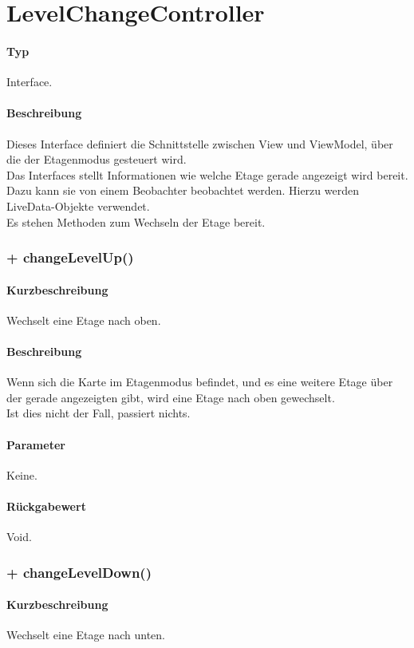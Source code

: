 \section{LevelChangeController}
\paragraph*{Typ}
Interface.
\paragraph*{Beschreibung}
Dieses Interface definiert die Schnittstelle zwischen View und ViewModel, über die 
der Etagenmodus gesteuert wird.\\
Das Interfaces stellt Informationen wie welche Etage gerade angezeigt wird bereit.
Dazu kann sie von einem Beobachter beobachtet werden. Hierzu werden LiveData-Objekte verwendet.\\
Es stehen Methoden zum Wechseln der Etage bereit.\\

\subsubsection{+ changeLevelUp()}%
\paragraph*{Kurzbeschreibung}
Wechselt eine Etage nach oben.
\paragraph*{Beschreibung}
Wenn sich die Karte im Etagenmodus befindet, und es eine weitere Etage über der gerade 
angezeigten gibt, wird eine Etage nach oben gewechselt.\\
Ist dies nicht der Fall, passiert nichts.
\paragraph*{Parameter}
Keine.
\paragraph*{Rückgabewert}
Void.

\subsubsection{+ changeLevelDown()}%
\paragraph*{Kurzbeschreibung}
Wechselt eine Etage nach unten.
